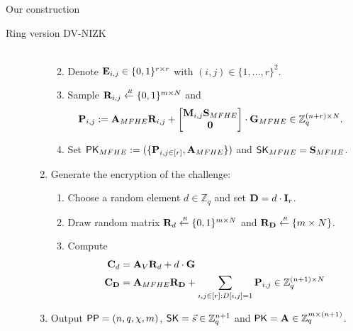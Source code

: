 \begin{section}{Our construction}
\begin{subsection}{Ring version DV-NIZK}
\begin{description}
\begin{enumerate}
\begin{enumerate}
\begin{align*}
          \end{align*}
        \item Denote $\mathbf{E}_{i,j} \in \{0, 1\}^{r\times r}$ with $(i,j) \in \{1, \dots ,r\}^2$.
        \item Sample $\mathbf{R}_{i,j} \stackrel{{\scriptscriptstyle \mkern4mu R}}{\gets} \{0,1\}^{m \times N}$ and
          \begin{align*}
            \mathbf{P}_{i,j} &:= \mathbf{A}_{MFHE} \mathbf{R}_{i,j} + \begin{bmatrix}\mathbf{M}_{i,j}\mathbf{S}_{MFHE}\\ \mathbf{0}\end{bmatrix}\cdot  \mathbf{G}_{MFHE} \in \mathbb{Z}_q^{(n+r) \times N}.
          \end{align*}
        \item Set $\mathsf{PK}_{MFHE} := (\{\mathbf{P}_{i,j \in [r]}, \mathbf{A}_{MFHE}\})$ and $\mathsf{SK}_{MFHE} = \mathbf{S}_{MFHE}$.
        \end{enumerate}
      \item Generate the encryption of the challenge:
        \begin{enumerate}
        \item Choose a random element $d \in \mathbb{Z}_{q}$ and set $\mathbf{D} = d \cdot \mathbf{I}_r$.
        \item Draw random matrix $\mathbf{R}_d \stackrel{{\scriptscriptstyle \mkern4mu R}}{\gets} \{0,1\}^{m \times N}$ and $\mathbf{R}_{\mathbf{D}} \stackrel{{\scriptscriptstyle \mkern4mu R}}{\gets} \{m \times N\}$.
        \item Compute
          \begin{align*}
            \mathbf{C}_d &= \mathbf{A}_V \mathbf{R}_d + d \cdot \mathbf{G}\\
            \mathbf{C}_{\mathbf{D}} &= \mathbf{A}_{MFHE} \mathbf{R}_{\mathbf{D}} + \sum_{i,j \in [r]: D[i,j] = 1} \mathbf{P}_{i,j} \in \mathbb{Z}_q^{(n+1) \times N}
          \end{align*}
        \end{enumerate}
      \item Output ${\mathsf{PP}} = (n, q, \chi, m)$, $\mathsf{SK} = \vec{s} \in \mathbb{Z}_q^{n+1}$ and $\mathsf{PK} = \mathbf{A} \in \mathbb{Z}_q^{m \times (n+1)}$.
      \end{enumerate}




\end{description}
\end{subsection}
\end{section}

